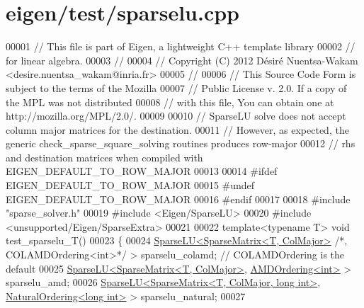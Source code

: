 \hypertarget{eigen_2test_2sparselu_8cpp_source}{}\section{eigen/test/sparselu.cpp}
\label{eigen_2test_2sparselu_8cpp_source}

\begin{DoxyCode}
00001 \textcolor{comment}{// This file is part of Eigen, a lightweight C++ template library}
00002 \textcolor{comment}{// for linear algebra.}
00003 \textcolor{comment}{//}
00004 \textcolor{comment}{// Copyright (C) 2012 Désiré Nuentsa-Wakam <desire.nuentsa\_wakam@inria.fr>}
00005 \textcolor{comment}{//}
00006 \textcolor{comment}{// This Source Code Form is subject to the terms of the Mozilla}
00007 \textcolor{comment}{// Public License v. 2.0. If a copy of the MPL was not distributed}
00008 \textcolor{comment}{// with this file, You can obtain one at http://mozilla.org/MPL/2.0/.}
00009 
00010 \textcolor{comment}{// SparseLU solve does not accept column major matrices for the destination.}
00011 \textcolor{comment}{// However, as expected, the generic check\_sparse\_square\_solving routines produces row-major}
00012 \textcolor{comment}{// rhs and destination matrices when compiled with EIGEN\_DEFAULT\_TO\_ROW\_MAJOR}
00013 
00014 \textcolor{preprocessor}{#ifdef EIGEN\_DEFAULT\_TO\_ROW\_MAJOR}
00015 \textcolor{preprocessor}{#undef EIGEN\_DEFAULT\_TO\_ROW\_MAJOR}
00016 \textcolor{preprocessor}{#endif}
00017 
00018 \textcolor{preprocessor}{#include "sparse\_solver.h"}
00019 \textcolor{preprocessor}{#include <Eigen/SparseLU>}
00020 \textcolor{preprocessor}{#include <unsupported/Eigen/SparseExtra>}
00021 
00022 \textcolor{keyword}{template}<\textcolor{keyword}{typename} T> \textcolor{keywordtype}{void} test\_sparselu\_T()
00023 \{
00024   \hyperlink{group___sparse_l_u___module_class_eigen_1_1_sparse_l_u}{SparseLU<SparseMatrix<T, ColMajor>} \textcolor{comment}{/*, COLAMDOrdering<int>*/} > 
      sparselu\_colamd; \textcolor{comment}{// COLAMDOrdering is the default}
00025   \hyperlink{group___sparse_l_u___module_class_eigen_1_1_sparse_l_u}{SparseLU<SparseMatrix<T, ColMajor>}, 
      \hyperlink{group___ordering_methods___module_class_eigen_1_1_a_m_d_ordering}{AMDOrdering<int>} > sparselu\_amd; 
00026   \hyperlink{group___sparse_l_u___module_class_eigen_1_1_sparse_l_u}{SparseLU<SparseMatrix<T, ColMajor, long int>}, 
      \hyperlink{group___ordering_methods___module_class_eigen_1_1_natural_ordering}{NaturalOrdering<long int>} > sparselu\_natural;
00027   

\end{DoxyCode}
